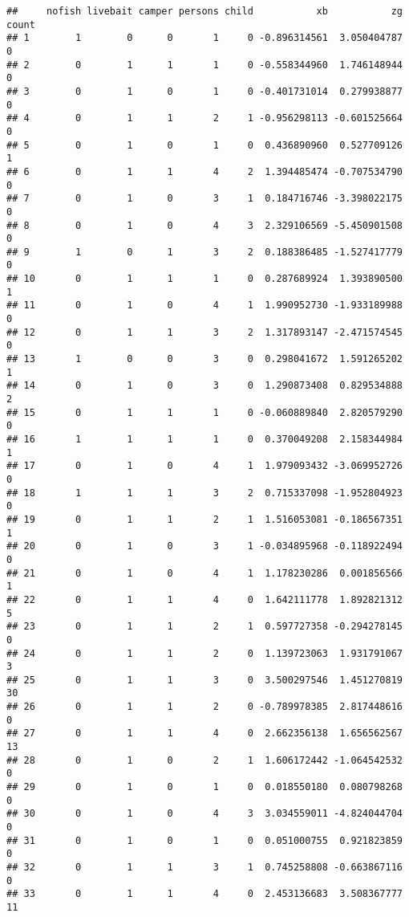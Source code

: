 \documentclass[]{article}
\begin{document}
\begin{verbatim}
##     nofish livebait camper persons child           xb           zg count
## 1        1        0      0       1     0 -0.896314561  3.050404787     0
## 2        0        1      1       1     0 -0.558344960  1.746148944     0
## 3        0        1      0       1     0 -0.401731014  0.279938877     0
## 4        0        1      1       2     1 -0.956298113 -0.601525664     0
## 5        0        1      0       1     0  0.436890960  0.527709126     1
## 6        0        1      1       4     2  1.394485474 -0.707534790     0
## 7        0        1      0       3     1  0.184716746 -3.398022175     0
## 8        0        1      0       4     3  2.329106569 -5.450901508     0
## 9        1        0      1       3     2  0.188386485 -1.527417779     0
## 10       0        1      1       1     0  0.287689924  1.393890500     1
## 11       0        1      0       4     1  1.990952730 -1.933189988     0
## 12       0        1      1       3     2  1.317893147 -2.471574545     0
## 13       1        0      0       3     0  0.298041672  1.591265202     1
## 14       0        1      0       3     0  1.290873408  0.829534888     2
## 15       0        1      1       1     0 -0.060889840  2.820579290     0
## 16       1        1      1       1     0  0.370049208  2.158344984     1
## 17       0        1      0       4     1  1.979093432 -3.069952726     0
## 18       1        1      1       3     2  0.715337098 -1.952804923     0
## 19       0        1      1       2     1  1.516053081 -0.186567351     1
## 20       0        1      0       3     1 -0.034895968 -0.118922494     0
## 21       0        1      0       4     1  1.178230286  0.001856566     1
## 22       0        1      1       4     0  1.642111778  1.892821312     5
## 23       0        1      1       2     1  0.597727358 -0.294278145     0
## 24       0        1      1       2     0  1.139723063  1.931791067     3
## 25       0        1      1       3     0  3.500297546  1.451270819    30
## 26       0        1      1       2     0 -0.789978385  2.817448616     0
## 27       0        1      1       4     0  2.662356138  1.656562567    13
## 28       0        1      0       2     1  1.606172442 -1.064542532     0
## 29       0        1      0       1     0  0.018550180  0.080798268     0
## 30       0        1      0       4     3  3.034559011 -4.824044704     0
## 31       0        1      0       1     0  0.051000755  0.921823859     0
## 32       0        1      1       3     1  0.745258808 -0.663867116     0
## 33       0        1      1       4     0  2.453136683  3.508367777    11

\end{verbatim}
\end{document}
